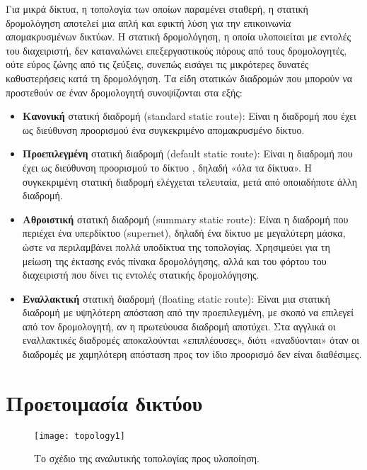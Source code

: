 \documentclass{EdipyLabs} %
\begin{document}
Για μικρά δίκτυα, η τοπολογία των οποίων παραμένει σταθερή, η στατική δρομολόγηση αποτελεί μια απλή και εφικτή λύση για την επικοινωνία απομακρυσμένων δικτύων. Η στατική δρομολόγηση, η οποία υλοποιείται με εντολές του διαχειριστή, δεν καταναλώνει επεξεργαστικούς πόρους από τους δρομολογητές, ούτε εύρος ζώνης από τις ζεύξεις, συνεπώς εισάγει τις μικρότερες δυνατές καθυστερήσεις κατά τη δρομολόγηση. Τα είδη στατικών διαδρομών που μπορούν να προστεθούν σε έναν δρομολογητή συνοψίζονται στα εξής:
\begin{itemize}
	\item \textbf{Κανονική} στατική διαδρομή (standard static route): Είναι η διαδρομή που έχει ως διεύθυνση προορισμού ένα συγκεκριμένο απομακρυσμένο δίκτυο. 
	\item \textbf{Προεπιλεγμένη} στατική διαδρομή (default static route): Είναι η διαδρομή που έχει ως διεύθυνση προορισμού το δίκτυο , δηλαδή «όλα τα δίκτυα». Η συγκεκριμένη στατική διαδρομή ελέγχεται τελευταία, μετά από οποιαδήποτε άλλη διαδρομή. 
	\item \textbf{Αθροιστική} στατική διαδρομή (summary static route): Είναι η διαδρομή που περιέχει ένα υπερδίκτυο (supernet), δηλαδή ένα δίκτυο με μεγαλύτερη μάσκα, ώστε να περιλαμβάνει πολλά υποδίκτυα της τοπολογίας. Χρησιμεύει για τη μείωση της έκτασης ενός πίνακα δρομολόγησης, αλλά και του φόρτου του διαχειριστή που δίνει τις εντολές στατικής δρομολόγησης.
	\item \textbf{Εναλλακτική} στατική διαδρομή (floating static route): Είναι μια στατική διαδρομή με υψηλότερη απόσταση από την προεπιλεγμένη, με σκοπό να επιλεγεί από τον δρομολογητή, αν η πρωτεύουσα διαδρομή αποτύχει. Στα αγγλικά οι εναλλακτικές διαδρομές αποκαλούνται «επιπλέουσες», διότι «αναδύονται» όταν οι διαδρομές με χαμηλότερη απόσταση προς τον ίδιο προορισμό δεν είναι διαθέσιμες.
\end{itemize}
\newpage

\section{Προετοιμασία δικτύου}

\begin{figure}[H]
	\centering
	\texttt{[image: topology1]}
	\caption{Το σχέδιο της αναλυτικής τοπολογίας προς υλοποίηση.}\label{fig:topology1}
\end{figure}
\end{document}
